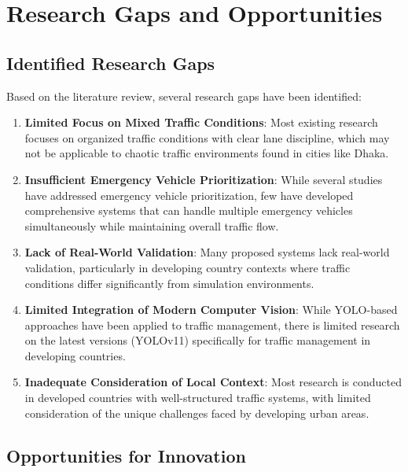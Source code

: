 \section{Research Gaps and Opportunities}

\subsection{Identified Research Gaps}

Based on the literature review, several research gaps have been identified:

\begin{enumerate}
    \item \textbf{Limited Focus on Mixed Traffic Conditions}: Most existing research focuses on organized traffic conditions with clear lane discipline, which may not be applicable to chaotic traffic environments found in cities like Dhaka.
    
    \item \textbf{Insufficient Emergency Vehicle Prioritization}: While several studies have addressed emergency vehicle prioritization, few have developed comprehensive systems that can handle multiple emergency vehicles simultaneously while maintaining overall traffic flow.
    
    \item \textbf{Lack of Real-World Validation}: Many proposed systems lack real-world validation, particularly in developing country contexts where traffic conditions differ significantly from simulation environments.
    
    \item \textbf{Limited Integration of Modern Computer Vision}: While YOLO-based approaches have been applied to traffic management, there is limited research on the latest versions (YOLOv11) specifically for traffic management in developing countries.
    
    \item \textbf{Inadequate Consideration of Local Context}: Most research is conducted in developed countries with well-structured traffic systems, with limited consideration of the unique challenges faced by developing urban areas.
\end{enumerate}

\subsection{Opportunities for Innovation}

